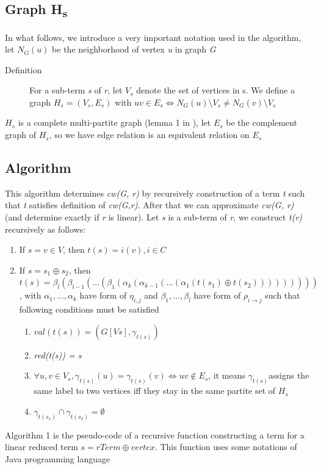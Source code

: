 \documentclass[a4paper, 12pt]{article}
\begin{document}
\subsection {Graph H\textsubscript{s}}

In what follows, we introduce a very important notation used in the algorithm, let \textit {$N_{G}(u)$} be the neighborhood of vertex \textit {u} in graph \textit {G} 

\begin{description}
\item [{Definition}] \cite {vadim-lozin} For a sub-term \textit {s} of \textit {r}, let \textit {$V_{s}$} denote the set of vertices in s. We define a graph \textit {$H_{s}=(V_{s}, E_{s})$} with $uv\in E_{s}\Longleftrightarrow N_{G}(u)\setminus V_{s}\neq N_{G}(v)\setminus V_{s}$
\end{description}
\textit{$H_{s}$} is a complete multi-partite graph (lemma 1 in \cite{vadim-lozin}), let \textit{$E_{s}$} be the complement graph of \textit{$H_{s}$}, so we have edge relation is an equivalent relation on \textit{$E_{s}$}

\subsection{Algorithm}

This algorithm determines \textit {cw(G, r)} by recursively construction of a term \textit {t} such that \textit {t} satisfies definition of \textit {cw(G,r)}. After that we can approximate \textit {cw(G, r)} (and determine exactly if  \textit {r} is linear). Let \textit {s} is a sub-term of \textit {r}, we construct \textit {t(r)} recursively as follows:

\begin{enumerate}
\item If $s=v\in V$, then $t(s)=i(v),i\in C$ 
\item If $s=s_{1}\oplus s_{2}$, then $t(s)=\beta_{l}(\beta_{l-1}(...(\beta_{1}(\alpha_{k}(\alpha_{k-1}(...(\alpha_{1}(t(s_{1})\oplus t(s_{2})))))))))$, with \textit {$\alpha_{1},...,\alpha_{k}$} have form of $\eta_{i,j}$ and \textit {$\beta_{1},...,\beta_{l}$} have form of $\rho_{i\rightarrow j}$ such that following conditions must be satisfied

\begin{enumerate}
\item \textit {$val(t(s))=(G[Vs],\gamma_{t(s)})$} 
\item \textit {red(t(s)) = s} 
\item $\forall u,v\in V_{s},\gamma_{t(s)}(u)=\gamma_{t(s)}(v)\Leftrightarrow uv\notin E_{s}$,
it means \textit {$\gamma_{t(s)}$}assigns the same label to two vertices iff they stay in the same partite set of \textit {$H_{s}$} 
\item \textit {$\gamma_{t(s_{1})}\cap\gamma_{t(s_{2})}=\emptyset$} \end{enumerate}
\end{enumerate}
Algorithm 1 is the pseudo-code of a recursive function constructing a term for a linear reduced term {$s=rTerm\oplus vertex$}. This function uses some notations of Java programming language
\end{document}
